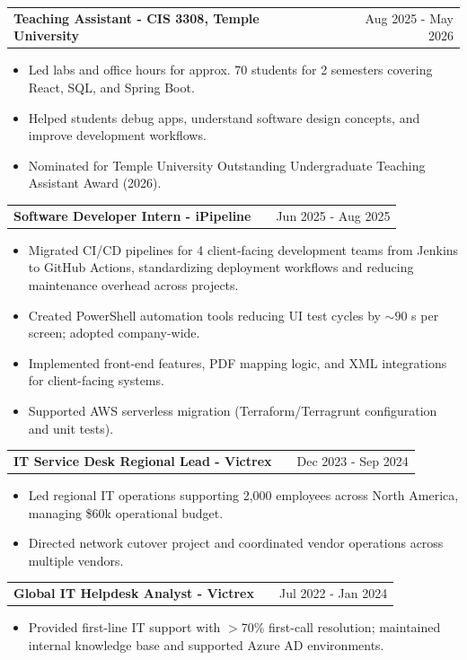 \documentclass[a4paper,12pt]{article}
\makeatletter
\newenvironment{joblong}[2]
    {
    \begin{tabularx}{\linewidth}{@{}l X r@{}}
    \textbf{#1} & \hfill &  #2 \\[3.75pt]
    \end{tabularx}
    \begin{minipage}[t]{\linewidth}
    \begin{itemize}[nosep,after=\strut, leftmargin=1em, itemsep=3pt,label=--]
    }
    {
    \end{itemize}
    \end{minipage}
    }
\makeatother
\begin{document}
\begin{joblong}{Teaching Assistant - CIS 3308, Temple University}{Aug 2025 - May 2026}
\item Led labs and office hours for approx. 70 students for 2 semesters covering React, SQL, and Spring Boot.
\item Helped students debug apps, understand software design concepts, and improve development workflows.
\item Nominated for Temple University Outstanding Undergraduate Teaching Assistant Award (2026).
\end{joblong}

\begin{joblong}{Software Developer Intern - iPipeline}{Jun 2025 - Aug 2025}
\item Migrated CI/CD pipelines for 4 client-facing development teams from Jenkins to GitHub Actions, standardizing deployment workflows and reducing maintenance overhead across projects.
\item Created PowerShell automation tools reducing UI test cycles by $\sim90$ s per screen; adopted company-wide.
\item Implemented front-end features, PDF mapping logic, and XML integrations for client-facing systems.
\item Supported AWS serverless migration (Terraform/Terragrunt configuration and unit tests).
\end{joblong}

\begin{joblong}{IT Service Desk Regional Lead - Victrex}{Dec 2023 - Sep 2024}
\item Led regional IT operations supporting 2,000 employees across North America, managing \$60k operational budget.
\item Directed network cutover project and coordinated vendor operations across multiple vendors.
\end{joblong}

\begin{joblong}{Global IT Helpdesk Analyst - Victrex}{Jul 2022 - Jan 2024}
\item Provided first-line IT support with $>$70\% first-call resolution; maintained internal knowledge base and supported Azure AD environments.
\end{joblong}

\end{document}
